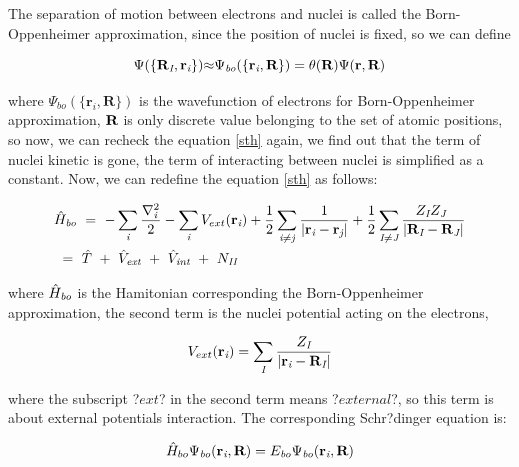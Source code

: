 \documentclass[a4paper, 12pt, titlepage,oneside,drop]{kthesis}
\begin{document}
\noindent The separation of motion between electrons and nuclei is called the Born-Oppenheimer approximation, since the position of nuclei is fixed, so we can define

\begin{equation}\label{nwf}
{\Psi(\{\textbf{R}_\textit{I}, \textbf{r}_\textit{i} \})}  {\approx}  {\Psi_{ \textit{bo}} ( \{ {\textbf{r}_{\textit{i}}},\textbf{R} \}) } = {\theta(\textbf{R})} {\Psi(\textbf{r}, \textbf{R})}
\end{equation}

 \noindent where $\Psi_{ \textit{bo}} ( \{ {\textbf{r}_{\textit{i}}},\textbf{R} \})$  is the wavefunction of electrons for Born-Oppenheimer approximation, $\textbf R$ is only discrete value belonging to the set of atomic positions, 
 so now, we can recheck the equation \ref{sth} again, we find out that the term of nuclei kinetic is gone, the term of interacting
 between nuclei is simplified as a constant. Now, we can redefine the equation \ref{sth} as follows:

\begin{equation}\label{both}\begin{split}
&{\hath}_\textit{bo}\ =\ - \sumi<i>   \frac{{{\nabla}_{\textit{i}}^{2}}}{2}  - \sumi<i> V_{ext}(\textbf{r}_{\textit{i}})  + \frac{1}{2} \suminj<i><j> \frac{1}{ |\textbf{r}_\textit{i}-\textbf{r}_\textit{j}|} + \frac{1}{2} \suminj<I><J> \frac{Z_\textit{I} Z_\textit{J}\ }{|\textbf{R}_\textit{I}-\textbf{R}_\textit{J}|} \\
&\ = \ \hat{T} \ + \ \hat{V}_\textit{ext} \ + \ \hat{V}_\textit{int}\ + \ N_\textit{II}
\end{split}\end{equation}

\noindent where ${\hat{H}}_\textit{bo}$  is the Hamitonian corresponding the Born-Oppenheimer approximation, the second term is the nuclei potential acting on the
electrons, 

\begin{equation}
V_{ext}(\textbf{r}_{\textit{i}}) =  \sumi<I> \frac{Z_\textit{I}}{|\textbf{r}_\textit{i}-\textbf{R}_\textit{I}|}
\end{equation}

\noindent where the subscript ?$ext$? in the second term means ?$external$?, so this term is about external potentials interaction. 
The corresponding Schr?dinger equation is:

\begin{equation}\label{bose}
{\hat{H}}_{bo} \Psi_{\textit{bo}}({\textbf{r}_{\textit{i}}},\textbf{R} ) = E_\textit{bo} {\Psi_{\textit{bo}}({\textbf{r}_{\textit{i}}},\textbf{R} )}
\end{equation}
\end{document}
